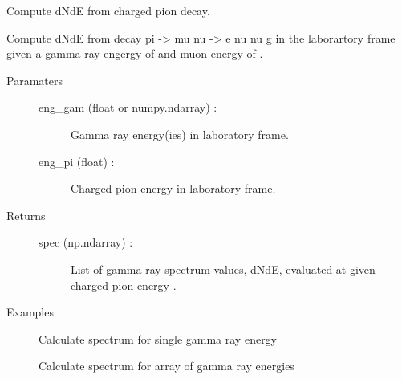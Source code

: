 \documentclass[letterpaper,10pt,english]{sphinxmanual}
\begin{document}
\begin{fulllineitems}
\label{\detokenize{modules:hazma.charged_pion.decay_spectra}}
Compute dNdE from charged pion decay.

Compute dNdE from decay pi -\textgreater{} mu nu -\textgreater{} e nu nu g in the laborartory frame
given a gamma ray engergy of  and muon energy of .
\begin{description}
\item[{Paramaters}] \leavevmode\begin{description}
\item[{eng\_gam (float or numpy.ndarray) :}] \leavevmode
Gamma ray energy(ies) in laboratory frame.

\item[{eng\_pi (float) :}] \leavevmode
Charged pion energy in laboratory frame.

\end{description}

\item[{Returns}] \leavevmode\begin{description}
\item[{spec (np.ndarray) :}] \leavevmode
List of gamma ray spectrum values, dNdE, evaluated at 
given charged pion energy .

\end{description}

\item[{Examples}] \leavevmode
Calculate spectrum for single gamma ray energy

\begin{sphinxVerbatim}[commandchars=\\\{\}]
   
    
   
\end{sphinxVerbatim}

Calculate spectrum for array of gamma ray energies


\end{description}
\end{fulllineitems}
\end{document}
